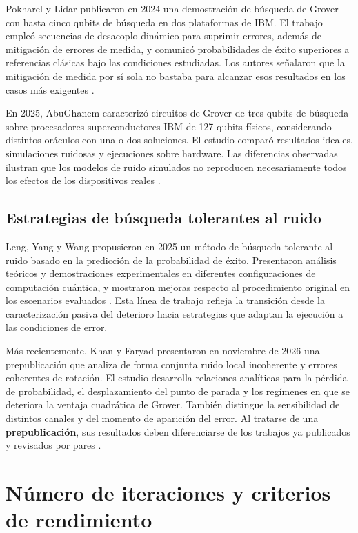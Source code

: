 \documentclass[11pt,a4paper]{article}
\begin{document}
Pokharel y Lidar publicaron en 2024 una demostración de búsqueda de Grover con hasta cinco qubits de búsqueda en dos plataformas de IBM. El trabajo empleó secuencias de desacoplo dinámico para suprimir errores, además de mitigación de errores de medida, y comunicó probabilidades de éxito superiores a referencias clásicas bajo las condiciones estudiadas. Los autores señalaron que la mitigación de medida por sí sola no bastaba para alcanzar esos resultados en los casos más exigentes \cite{pokharel2024}.

En 2025, AbuGhanem caracterizó circuitos de Grover de tres qubits de búsqueda sobre procesadores superconductores IBM de 127 qubits físicos, considerando distintos oráculos con una o dos soluciones. El estudio comparó resultados ideales, simulaciones ruidosas y ejecuciones sobre hardware. Las diferencias observadas ilustran que los modelos de ruido simulados no reproducen necesariamente todos los efectos de los dispositivos reales \cite{abughanem2025}.

\subsection{Estrategias de búsqueda tolerantes al ruido}

Leng, Yang y Wang propusieron en 2025 un método de búsqueda tolerante al ruido basado en la predicción de la probabilidad de éxito. Presentaron análisis teóricos y demostraciones experimentales en diferentes configuraciones de computación cuántica, y mostraron mejoras respecto al procedimiento original en los escenarios evaluados \cite{leng2025}. Esta línea de trabajo refleja la transición desde la caracterización pasiva del deterioro hacia estrategias que adaptan la ejecución a las condiciones de error.

Más recientemente, Khan y Faryad presentaron en noviembre de 2026 una prepublicación que analiza de forma conjunta ruido local incoherente y errores coherentes de rotación. El estudio desarrolla relaciones analíticas para la pérdida de probabilidad, el desplazamiento del punto de parada y los regímenes en que se deteriora la ventaja cuadrática de Grover. También distingue la sensibilidad de distintos canales y del momento de aparición del error. Al tratarse de una \textbf{prepublicación}, sus resultados deben diferenciarse de los trabajos ya publicados y revisados por pares \cite{khan2026}.

\section{Número de iteraciones y criterios de rendimiento}
\end{document}
